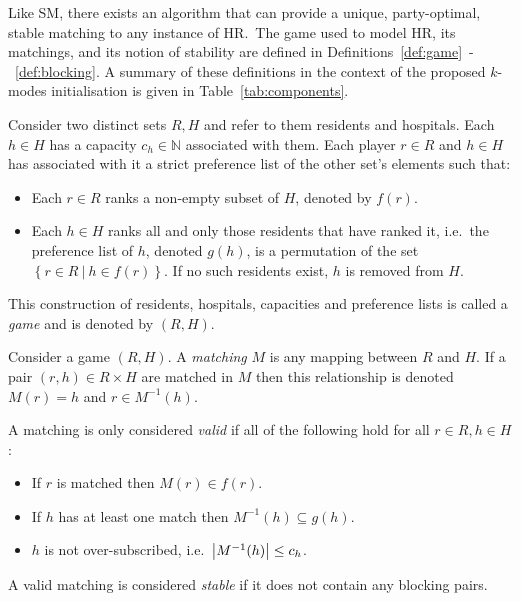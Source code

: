 Like SM, there exists an algorithm that can provide a unique, party-optimal,
stable matching to any instance of HR.\ The game used to model HR, its
matchings, and its notion of stability are defined in
Definitions~\ref{def:game}~\--~\ref{def:blocking}. A summary of these
definitions in the context of the proposed \(k\)-modes initialisation is given
in Table~\ref{tab:components}.

\begin{definition}\label{def:game}
    Consider two distinct sets \(R, H\) and refer to them residents and
    hospitals. Each \(h \in H\) has a capacity \(c_h \in \mathbb{N}\) associated
    with them. Each player \(r \in R\) and \(h \in H\) has associated 
    with it a strict preference list of the other set's elements such that:
    \begin{itemize}
        \item Each \(r \in R\) ranks a non-empty subset of \(H\), denoted by
            \(f(r)\).
        \item Each \(h \in H\) ranks all and only those residents that have
            ranked it, i.e.\ the preference list of \(h\), denoted \(g(h)\), is
            a permutation of the set
            \(\left\{r \in R \ | \ h \in f(r)\right\}\). If no such residents
            exist, \(h\) is removed from \(H\).
    \end{itemize}

    This construction of residents, hospitals, capacities and preference lists
    is called a \emph{game} and is denoted by \((R, H)\).
\end{definition}

\begin{definition}\label{def:matching}
    Consider a game \((R, H)\). A \emph{matching} \(M\) is any mapping between
    \(R\) and \(H\). If a pair \((r, h) \in R \times H\) are matched in \(M\)
    then this relationship is denoted \(M(r) = h\) and \(r \in M^{-1}(h)\).

    A matching is only considered \emph{valid} if all of the following hold for
    all \(r \in R, h \in H\):
    \begin{itemize}
        \item If \(r\) is matched then \(M(r) \in f(r)\).
        \item If \(h\) has at least one match then \(M^{-1}(h) \subseteq g(h)\).
        \item \(h\) is not over-subscribed, i.e.\ \(\abs*{M^{-1}(h)} \leq c_h\).
    \end{itemize}

    A valid matching is considered \emph{stable} if it does not contain any
    blocking pairs.
\end{definition}

